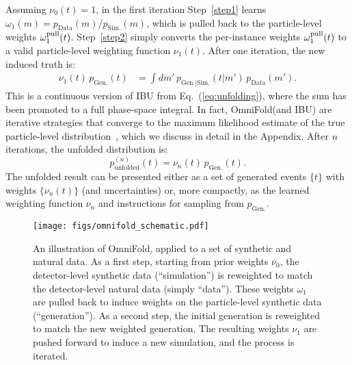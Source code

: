 \documentclass[prl,twocolumn,superscriptaddress,longbibliography,preprintnumbers,nofootinbib]{revtex4-1}
\DeclareRobustCommand{\Eq}[1]{Eq.~(\ref{eq:#1})}
\newcommand{\OmniFold}{{\sc OmniFold}\xspace}
\begin{document}
Assuming $\nu_0(t)=1$, in the first iteration Step~\ref{step1} learns $\omega_1(m)=p_{\text{Data}}(m)/p_{\text{Sim.}}(m)$, which is pulled back to the particle-level weights $\omega^{\rm pull}_1(t)$.
%
Step~\ref{step2} simply converts the per-instance weights $\omega^{\rm pull}_1(t)$ to a valid particle-level weighting function $\nu_{1}(t)$.
%
After one iteration, the new induced truth is:
%
\begin{align}
\nu_1(t)\,p_{\text{Gen.}}(t) &= \int dm'\, p_{\text{Gen.}|\text{Sim.}}(t|m')\,p_{\text{Data}}(m').
\end{align}
%
This is a continuous version of IBU from \Eq{unfolding}, where the sum has been promoted to a full phase-space integral.
%
In fact, \OmniFold (and IBU) are iterative strategies that converge to the maximum likelihood estimate of the true particle-level distribution~\cite{shepp1982maximum,10.2307/2984875,wu1983,doi:10.1080/01621459.1985.10477119,Kuusela2012StatisticalII}, which we discuss in detail in the Appendix.
%
After $n$ iterations, the unfolded distribution is:
%
\begin{equation}
\label{eq:final_answer}
    p^{(n)}_\text{unfolded}(t)=\nu_n(t) \, p_{\text{Gen.}}(t).
\end{equation}
%
The unfolded result can be presented either as a set of generated events $\{{t}\}$ with weights $\{\nu_n({t})\}$ (and uncertainties) or, more compactly, as the learned weighting function $\nu_n$ and instructions for sampling from $p_\text{Gen.}$.


\begin{figure}[t]
    \centering
    \texttt{[image: figs/omnifold\_schematic.pdf]}
    \caption{An illustration of \OmniFold, applied to a set of synthetic and natural data.
    As a first step, starting from prior weights $\nu_0$, the detector-level synthetic data (``simulation'') is reweighted to match the detector-level natural data (simply ``data'').  
    These weights $\omega_{1}$ are pulled back to induce weights on the particle-level synthetic data (``generation'').
    As a second step, the initial generation is reweighted to match the new weighted generation.
    The resulting weights $\nu_{1}$ are pushed forward to induce a new simulation, and the process is iterated.}
    \label{fig:method}
\end{figure}
\end{document}
